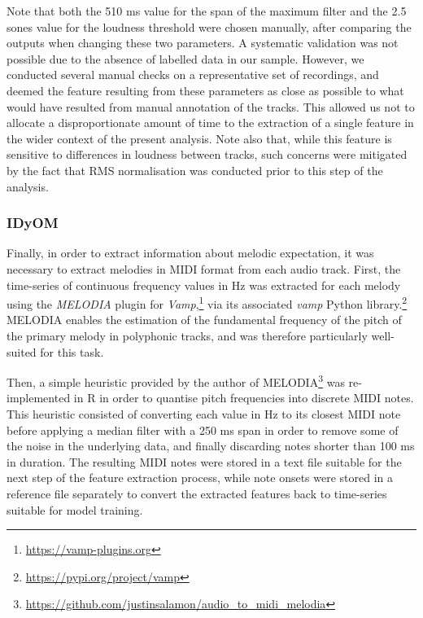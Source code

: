 Note that both the 510 ms value for the span of the maximum filter and the 2.5 sones value for the loudness threshold were chosen manually, after comparing the outputs when changing these two parameters. A systematic validation was not possible due to the absence of labelled data in our sample. However, we conducted several manual checks on a representative set of recordings, and deemed the feature resulting from these parameters as close as possible to what would have resulted from manual annotation of the tracks. This allowed us not to allocate a disproportionate amount of time to the extraction of a single feature in the wider context of the present analysis. Note also that, while this feature is sensitive to differences in loudness between tracks, such concerns were mitigated by the fact that RMS normalisation was conducted prior to this step of the analysis.

\subsubsection{IDyOM}

Finally, in order to extract information about melodic expectation, it was necessary to extract melodies in MIDI format from each audio track. First, the time-series of continuous frequency values in Hz was extracted for each melody using the \emph{MELODIA} plugin \parencite{salamon2012} for \emph{Vamp},\footnote{\url{https://vamp-plugins.org}} via its associated \emph{vamp} Python library.\footnote{\url{https://pypi.org/project/vamp}} MELODIA enables the estimation of the fundamental frequency of the pitch of the primary melody in polyphonic tracks, and was therefore particularly well-suited for this task.

Then, a simple heuristic provided by the author of MELODIA\footnote{\url{https://github.com/justinsalamon/audio_to_midi_melodia}} was re-implemented in R in order to quantise pitch frequencies into discrete MIDI notes. This heuristic consisted of converting each value in Hz to its closest MIDI note before applying a median filter with a 250 ms span in order to remove some of the noise in the underlying data, and finally discarding notes shorter than 100 ms in duration. The resulting MIDI notes were stored in a text file suitable for the next step of the feature extraction process, while note onsets were stored in a reference file separately to convert the extracted features back to time-series suitable for model training.

